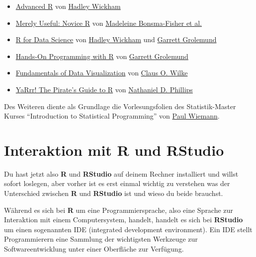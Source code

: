 \documentclass[
]{book}
\providecommand{\tightlist}{%
  \setlength{\itemsep}{0pt}\setlength{\parskip}{0pt}}
\begin{document}
\begin{itemize}
\tightlist
\item
  \href{http://adv-r.had.co.nz/}{Advanced R} von \href{http://hadley.nz/}{Hadley Wickham}
\item
  \href{https://merely-useful.github.io/r/index.html}{Merely Useful: Novice R} von \href{}{Madeleine Bonsma-Fisher et al.}
\item
  \protect\hyperlink{https:ux2fux2fr4ds.had.co.nzux2f}{R for Data Science} von \href{http://hadley.nz/}{Hadley Wickham} und \href{https://twitter.com/statgarrett?lang=de}{Garrett Grolemund}
\item
  \protect\hyperlink{https:ux2fux2frstudio-education.github.ioux2fhoprux2f}{Hands-On Programming with R} von \href{https://twitter.com/statgarrett?lang=de}{Garrett Grolemund}
\item
  \protect\hyperlink{https:ux2fux2fserialmentor.comux2fdatavizux2f}{Fundamentals of Data Visualization} von \href{https://github.com/clauswilke}{Claus O. Wilke}
\item
  \protect\hyperlink{https:ux2fux2fbookdown.orgux2fndphillipsux2fYaRrrux2f}{YaRrr! The Pirate's Guide to R} von \href{https://ndphillips.github.io/index.html}{Nathaniel D. Phillips}
\end{itemize}

Des Weiteren diente als Grundlage die Vorlesungsfolien des Statistik-Master Kurses ``Introduction to Statistical Programming'' von \href{https://www.uni-goettingen.de/de/525900.html}{Paul Wiemann}.

\hypertarget{intro}{%
\chapter{\texorpdfstring{Interaktion mit \textbf{R} und RStudio}{Interaktion mit R und RStudio}}\label{intro}}

Du hast jetzt also \textbf{R} und \textbf{RStudio} auf deinem Rechner installiert und willst sofort loslegen, aber vorher ist es erst einmal wichtig zu verstehen was der Unterschied zwischen \textbf{R} und \textbf{RStudio} ist und wieso du beide brauchst.

Während es sich bei \textbf{R} um eine Programmiersprache, also eine Sprache zur Interaktion mit einem Computersystem, handelt, handelt es sich bei \textbf{RStudio} um einen sogenannten IDE (integrated development environment). Ein IDE stellt Programmierern eine Sammlung der wichtigsten Werkzeuge zur Softwareentwicklung unter einer Oberfläche zur Verfügung.
\end{document}
